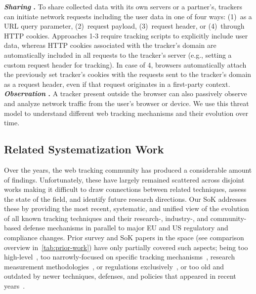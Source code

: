 %
\textbf{\textit{Sharing} \symSharing.}
%
To share collected data with its own servers or a partner's, trackers can initiate network requests including the user data in one of four ways: (1)~as a URL query parameter, (2)~request payload, (3)~request header, or (4)~through HTTP cookies.
%
Approaches 1-3 require tracking scripts to explicitly include user data, whereas HTTP cookies associated with the tracker's domain are automatically included in all requests to the tracker's server (e.g., setting a custom request header for tracking).
%
In case of 4, browsers automatically attach the previously set tracker's cookies with the requests sent to the tracker’s domain as a request header, even if that request originates in a first-party context.
%
\textbf{\textit{Observation} \symObservation.}
%
A tracker present outside the browser can also passively observe and analyze network traffic from the user's browser or device.
We use this threat model to understand different web tracking mechanisms and their evolution over time.


\subsection{Related Systematization Work}
%
Over the years, the web tracking community has produced a considerable amount of findings.
%
Unfortunately, these have largely remained scattered across disjoint works making it difficult to draw connections between related techniques, assess the state of the field, and identify future research directions.
%
Our SoK addresses these by providing the most recent, systematic, and unified view of the evolution of all known tracking techniques and their research-, industry-, and community-based defense mechanisms in parallel to major EU and US regulatory and compliance changes.
%
Prior survey and SoK papers in the space (see comparison overview in~\autoref{tab:prior-work}) have only partially covered such aspects; being too high-level~\cite{ermakova2018web,bujlowSurveyWebTracking2017}, too narrowly-focused on specific tracking mechanisms~\cite{laperdrix2020browser,rokickiSoKSearchLost2021}, research measurement methodologies~\cite{stafeevSoKStateKrawlers2024,riederSoKDecadesWeb2026}, or regulations exclusively~\cite{birrellSoKTechnicalImplementation2024}, or too old and outdated by newer techniques, defenses, and policies that appeared in recent years~\cite{mayerThirdPartyWebTracking2012,sanchez-rolaWebWatchingYou2017}.